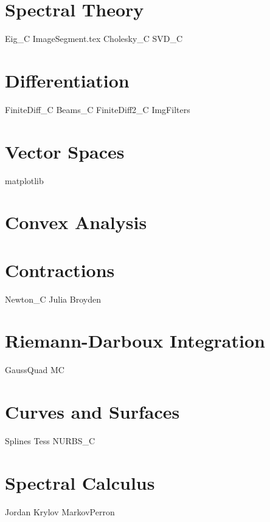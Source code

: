 \documentclass{newsiambook}
\begin{document}
\part{Spectral Theory}
{Eig_C}
{ImageSegment.tex}
{Cholesky_C}
{SVD_C}

\part{Differentiation}
{FiniteDiff_C}
{Beams_C}
{FiniteDiff2_C}
{ImgFilters}

\part{Vector Spaces}
{matplotlib}


\part{Convex Analysis}

\part{Contractions}
{Newton_C}
{Julia}
{Broyden}

\part{Riemann-Darboux Integration}
{GaussQuad}
{MC}


% 


\part{Curves and Surfaces}
{Splines}
{Tess}
{NURBS_C}

\part{Spectral Calculus}
{Jordan}
{Krylov}
{MarkovPerron}
\end{document}
